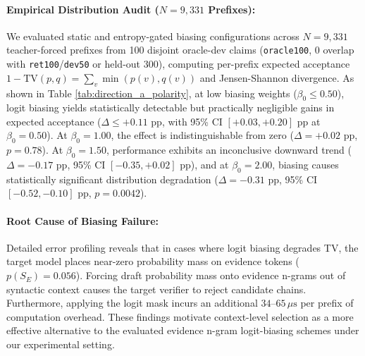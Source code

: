 \documentclass[11pt]{article}
\begin{document}
\paragraph{Empirical Distribution Audit ($N = 9,331$ Prefixes):}
We evaluated static and entropy-gated biasing configurations across $N = 9,331$ teacher-forced prefixes from 100 disjoint oracle-dev claims (\texttt{oracle100}, $0$ overlap with \texttt{ret100}/\texttt{dev50} or held-out 300), computing per-prefix expected acceptance $1 - \text{TV}(p, q) = \sum_v \min(p(v), q(v))$ and Jensen-Shannon divergence. As shown in Table \ref{tab:direction_a_polarity}, at low biasing weights ($\beta_0 \le 0.50$), logit biasing yields statistically detectable but practically negligible gains in expected acceptance ($\Delta \le +0.11\text{ pp}$, with 95\% CI $[+0.03, +0.20]\text{ pp}$ at $\beta_0 = 0.50$). At $\beta_0 = 1.00$, the effect is indistinguishable from zero ($\Delta = +0.02\text{ pp}$, $p = 0.78$). At $\beta_0 = 1.50$, performance exhibits an inconclusive downward trend ($\Delta = -0.17\text{ pp}$, 95\% CI $[-0.35, +0.02]\text{ pp}$), and at $\beta_0 = 2.00$, biasing causes statistically significant distribution degradation ($\Delta = -0.31\text{ pp}$, 95\% CI $[-0.52, -0.10]\text{ pp}$, $p = 0.0042$).

\paragraph{Root Cause of Biasing Failure:}
Detailed error profiling reveals that in cases where logit biasing degrades TV, the target model places near-zero probability mass on evidence tokens ($p(S_E) = 0.056$). Forcing draft probability mass onto evidence n-grams out of syntactic context causes the target verifier to reject candidate chains. Furthermore, applying the logit mask incurs an additional $34\text{--}65\,\mu\text{s}$ per prefix of computation overhead. These findings motivate context-level selection as a more effective alternative to the evaluated evidence n-gram logit-biasing schemes under our experimental setting.
\end{document}
